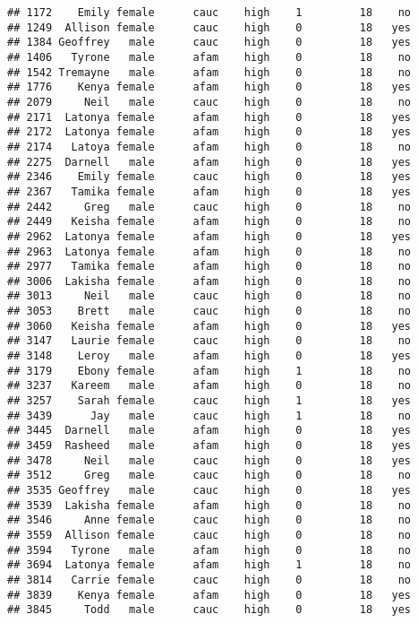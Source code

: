 \documentclass[
]{article}
\begin{document}
\begin{verbatim}
## 1172    Emily female      cauc    high    1         18    no
## 1249  Allison female      cauc    high    0         18   yes
## 1384 Geoffrey   male      cauc    high    0         18   yes
## 1406   Tyrone   male      afam    high    0         18    no
## 1542 Tremayne   male      afam    high    0         18    no
## 1776    Kenya female      afam    high    0         18   yes
## 2079     Neil   male      cauc    high    0         18    no
## 2171  Latonya female      afam    high    0         18   yes
## 2172  Latonya female      afam    high    0         18   yes
## 2174   Latoya female      afam    high    0         18    no
## 2275  Darnell   male      afam    high    0         18   yes
## 2346    Emily female      cauc    high    0         18   yes
## 2367   Tamika female      afam    high    0         18   yes
## 2442     Greg   male      cauc    high    0         18    no
## 2449   Keisha female      afam    high    0         18    no
## 2962  Latonya female      afam    high    0         18   yes
## 2963  Latonya female      afam    high    0         18    no
## 2977   Tamika female      afam    high    0         18    no
## 3006  Lakisha female      afam    high    0         18    no
## 3013     Neil   male      cauc    high    0         18    no
## 3053    Brett   male      cauc    high    0         18    no
## 3060   Keisha female      afam    high    0         18   yes
## 3147   Laurie female      cauc    high    0         18    no
## 3148    Leroy   male      afam    high    0         18   yes
## 3179    Ebony female      afam    high    1         18    no
## 3237   Kareem   male      afam    high    0         18    no
## 3257    Sarah female      cauc    high    1         18   yes
## 3439      Jay   male      cauc    high    1         18    no
## 3445  Darnell   male      afam    high    0         18   yes
## 3459  Rasheed   male      afam    high    0         18   yes
## 3478     Neil   male      cauc    high    0         18   yes
## 3512     Greg   male      cauc    high    0         18    no
## 3535 Geoffrey   male      cauc    high    0         18   yes
## 3539  Lakisha female      afam    high    0         18    no
## 3546     Anne female      cauc    high    0         18    no
## 3559  Allison female      cauc    high    0         18    no
## 3594   Tyrone   male      afam    high    0         18    no
## 3694  Latonya female      afam    high    1         18    no
## 3814   Carrie female      cauc    high    0         18    no
## 3839    Kenya female      afam    high    0         18   yes
## 3845     Todd   male      cauc    high    0         18   yes

\end{verbatim}
\end{document}
